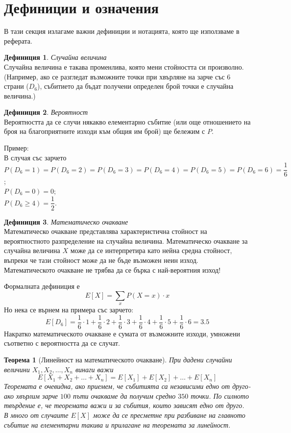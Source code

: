 \documentclass[11 pt, a4paper]{article}
\newtheorem{thm}{Теорема}
\theoremstyle{definition}
\newtheorem{defin}{Дефиниция}
\theoremstyle{remark}
\begin{document}
\section{Дефиниции и означения}
В тази секция излагаме важни дефиниции и нотацията, която ще използваме в реферата.
\begin{defin}{\textit{Случайна величина}}\\
Случайна величина е такава променлива, която мени стойността си произволно. (Например, ако се разгледат възможните точки при хвърляне на зарче със $6$ страни ($D_6$), събитието да бъдат получени определен брой точки е случайна величина.)
\end{defin}
\begin{defin}{\textit{Вероятност}}\\
Вероятността да се случи някакво елементарно събитие (или още отношението на броя на благоприятните изходи към общия им брой) ще бележим с $P$.\par
Пример:\\
В случая със зарчето\\
$P(D_6=1)=P(D_6=2)=P(D_6=3)=P(D_6=4)=P(D_6=5)=P(D_6=6)=\dfrac{1}{6}$;\\
$P(D_6=0)=0$;\\
$P(D_6\geq4)=\dfrac{1}{2}.$
\end{defin}
\begin{defin}{\textit{Математическо очакване}}\\
Математическо очакване представлява характеристична стойност на вероятностното разпределение на случайна величина. Математическо очакване за случайна величина $X$ може да се интерпретира като нейна средна стойност, въпреки че тази стойност може да не бъде възможен неин изход. Математическото очакване не трябва да се бърка с най-вероятния изход!\par
Формалната дефиниция е
\begin{equation*}
E[X]=\sum_{x}P(X=x) \cdot x 
\end{equation*}
Но нека се върнем на примера със зарчето:
\begin{equation*}
E[D_6]=\dfrac{1}{6}\cdot1+\dfrac{1}{6}\cdot2+ \dfrac{1}{6}\cdot3+\dfrac{1}{6}\cdot4+\dfrac{1}{6}\cdot5+
\dfrac{1}{6}\cdot6=3.5
\end{equation*}
Накратко математическото очакване е сумата от възможните изходи, умножени съответно с вероятността да се случат.
\end{defin}
\begin{thm}[Линейност на математическото очакване]
При дадени случайни величини $X_1,X_2,\dots,X_n$ винаги важи
\begin{equation*}
E[X_1+X_2+\dots+X_n]=E[X_1]+E[X_2]+\dots+E[X_n]
\end{equation*}
Теоремата е очевидна, ако приемем, че събитията са независими едно от друго-ако хвърлим зарче $100$ пъти очакваме да получим средно $350$ точки. По силното твърдение е, че теоремата важи и за събития, които зависят едно от друго. В много от случаите $E[X]$ може да се пресметне при разбиване на главното събитие на елементарни такива и прилагане на теоремата за линейност.\par
\end{thm}
\end{document}
